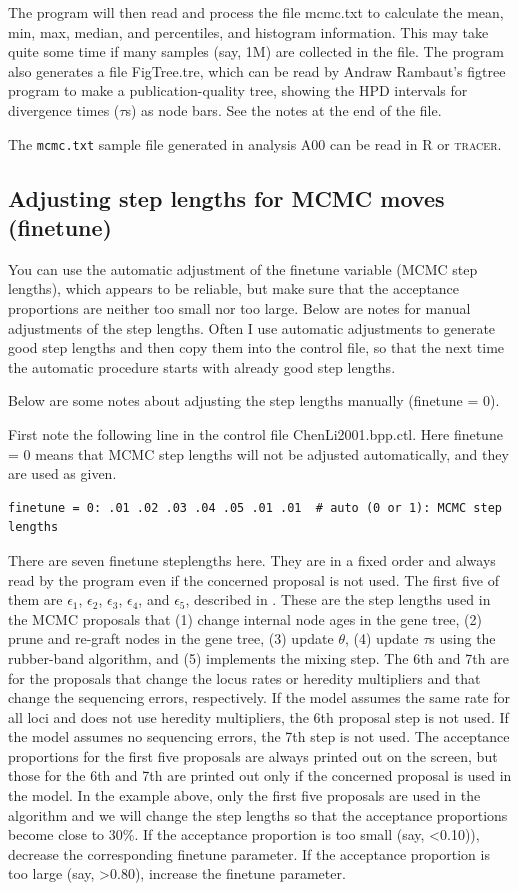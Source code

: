 \documentclass{book}
\numberwithin{equation}{section} \renewcommand{\baselinestretch}{0.55}
\begin{document}
The program will then read and process the file mcmc.txt to calculate
the mean, min, max, median, and percentiles, and histogram
information.  This may take quite some time if many samples (say, 1M)
are collected in the file.  The program also generates a file
FigTree.tre, which can be read by Andraw Rambaut’s figtree program to
make a publication-quality tree, showing the HPD intervals for
divergence times ($\tau$s) as node bars.  See the notes at the end of
the file.

The \texttt{mcmc.txt} sample file generated in analysis A00 can be
read in R or \textsc{tracer}.


\subsection{Adjusting step lengths for MCMC moves (finetune)}

You can use the automatic adjustment of the finetune variable (MCMC
step lengths), which appears to be reliable, but make sure that the
acceptance proportions are neither too small nor too large.  Below are
notes for manual adjustments of the step lengths.  Often I use
automatic adjustments to generate good step lengths and then copy them
into the control file, so that the next time the automatic procedure
starts with already good step lengths.

Below are some notes about adjusting the step lengths manually
(finetune = 0).

First note the following line in the control file ChenLi2001.bpp.ctl.
Here finetune = 0 means that MCMC step lengths will not be adjusted
automatically, and they are used as given.
\begin{verbatim}
finetune = 0: .01 .02 .03 .04 .05 .01 .01  # auto (0 or 1): MCMC step lengths
\end{verbatim}
There are seven finetune steplengths here.  They are in a fixed order
and always read by the program even if the concerned proposal is not
used.  The first five of them are $\epsilon_1$, $\epsilon_2$,
$\epsilon_3$, $\epsilon_4$, and $\epsilon_5$, described in
\citep{Rannala2003}. These are the step lengths used in the MCMC
proposals that (1) change internal node ages in the gene tree, (2)
prune and re-graft nodes in the gene tree, (3) update $\theta$, (4)
update $\tau$s using the rubber-band algorithm, and (5) implements the
mixing step.  The 6th and 7th are for the proposals that change the
locus rates or heredity multipliers and that change the sequencing
errors, respectively.  If the model assumes the same rate for all loci
and does not use heredity multipliers, the 6th proposal step is not
used.  If the model assumes no sequencing errors, the 7th step is not
used.  The acceptance proportions for the first five proposals are
always printed out on the screen, but those for the 6th and 7th are
printed out only if the concerned proposal is used in the model.  In
the example above, only the first five proposals are used in the
algorithm and we will change the step lengths so that the acceptance
proportions become close to 30\%.  If the acceptance proportion is too
small (say, <0.10)), decrease the corresponding finetune parameter.
If the acceptance proportion is too large (say, >0.80), increase the
finetune parameter.
\end{document}
